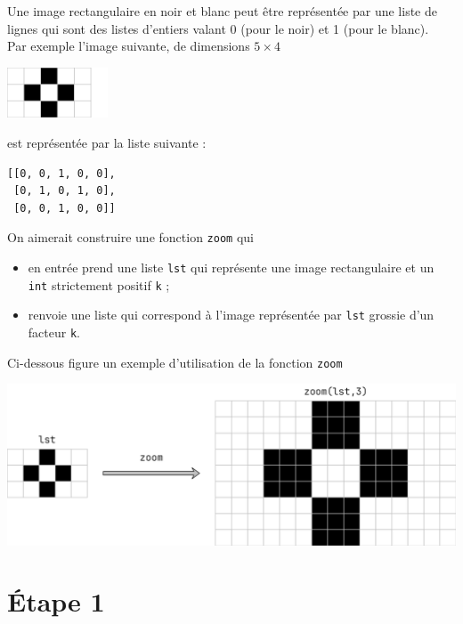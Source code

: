 \documentclass[a4paper,12pt,exos,firamath]{nsi}
\begin{document}
\maketitle

Une image rectangulaire en noir et blanc peut être représentée par une liste de lignes qui sont des listes d'entiers valant 0 (pour le noir) et 1 (pour le blanc).\\
Par exemple l'image suivante, de dimensions $5\times 4$
\begin{center}
    \includegraphics[width=3cm]{img/fig1.png}
\end{center}

est représentée par la liste suivante :
\begin{verbatim}
[[0, 0, 1, 0, 0], 
 [0, 1, 0, 1, 0],
 [0, 0, 1, 0, 0]]
\end{verbatim}

On aimerait construire une fonction \texttt{zoom} qui
\begin{itemize}
    \item en entrée prend une liste \texttt{lst} qui représente une image rectangulaire et un \texttt{int} strictement positif \texttt{k} ;
    \item renvoie une liste qui correspond à l'image représentée par \texttt{lst} grossie d'un facteur \texttt{k}.  
\end{itemize} 
Ci-dessous figure un exemple d'utilisation de la fonction \texttt{zoom}
\begin{center}
    \includegraphics[width=14cm]{img/fig0.png}
\end{center}
\section*{Étape 1}
\end{document}
